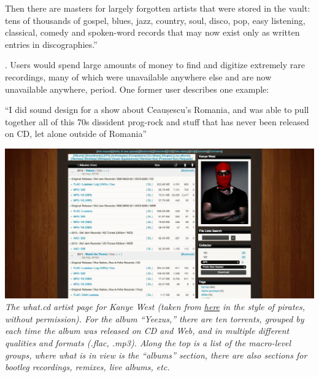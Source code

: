 \documentclass[10pt]{article}
\begin{document}
\begin{multicols}{2}
{\begin{leftbar}
  Then there are masters for largely forgotten artists that were stored
  in the vault: tens of thousands of gospel, blues, jazz, country, soul,
  disco, pop, easy listening, classical, comedy and spoken-word records
  that may now exist only as written entries in discographies.'' \cite{rosenDayMusicBurned2019} 
  \end{leftbar}}. Users would spend large amounts of money to find and
digitize extremely rare recordings, many of which were unavailable
anywhere else and are now unavailable anywhere, period. One former user
describes one example:

\begin{leftbar}
``I did sound design for a show about Ceaușescu's Romania, and was able
to pull together all of this 70s dissident prog-rock and stuff that has
never been released on CD, let alone outside of Romania'' \cite{sonnadEulogyWhatCd2016} 
\end{leftbar}

\includegraphics[width=\linewidth]{../assets/images/kanye-what.png} \emph{The
what.cd artist page for Kanye West (taken from
\href{https://qz.com/840661/what-cd-is-gone-a-eulogy-for-the-greatest-music-collection-in-the-world/}{here}
in the style of pirates, without permission). For the album ``Yeezus,''
there are ten torrents, grouped by each time the album was released on
CD and Web, and in multiple different qualities and formats (.flac,
.mp3). Along the top is a list of the macro-level groups, where what is
in view is the ``albums'' section, there are also sections for bootleg
recordings, remixes, live albums, etc.}


\end{multicols}
\end{document}
